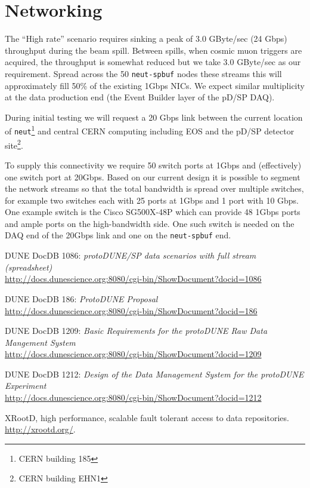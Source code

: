 \documentclass[pdftex,12pt,letter]{article}
\begin{document}
\section{Networking}

The ``High rate'' scenario requires sinking a peak of 3.0 GByte/sec
(24 Gbps) throughput during the beam spill.  Between spills, when
cosmic muon triggers are acquired, the throughput is somewhat reduced
but we take 3.0 GByte/sec as our requirement.  Spread across the 50
\texttt{neut-spbuf} nodes these streams this will approximately fill
50\% of the existing 1Gbps NICs.  We expect similar multiplicity at
the data production end (the Event Builder layer of the pD/SP DAQ).

During initial testing we will request a 20 Gbps link between the
current location of \texttt{neut}\footnote{CERN building 185} and
central CERN computing including EOS and the pD/SP detector
site\footnote{CERN building EHN1}.

To supply this connectivity we require 50 switch ports at 1Gbps and
(effectively) one switch port at 20Gbps.  Based on our current design
it is possible to segment the network streams so that the total
bandwidth is spread over multiple switches, for example two switches
each with 25 ports at 1Gbps and 1 port with 10 Gbps.  One example
switch is the Cisco SG500X-48P which can provide 48 1Gbps ports and
ample ports on the high-bandwidth side.  One such switch is needed on
the DAQ end of the 20Gbps link and one on the \texttt{neut-spbuf} end.

\begin{thebibliography}{1}
{DUNE DocDB 1086: \textit{ protoDUNE/SP data scenarios with full stream (spreadsheet)}}\\
\url{http://docs.dunescience.org:8080/cgi-bin/ShowDocument?docid=1086}

{DUNE DocDB 186: \textit{ ProtoDUNE Proposal}}\\
\url{http://docs.dunescience.org:8080/cgi-bin/ShowDocument?docid=186}


{DUNE DocDB 1209: \textit{Basic Requirements for the protoDUNE Raw Data Mangement System}}\\
\url{http://docs.dunescience.org:8080/cgi-bin/ShowDocument?docid=1209}


{DUNE DocDB 1212: \textit{Design of the Data Management System for the protoDUNE Experiment}}\\
\url{http://docs.dunescience.org:8080/cgi-bin/ShowDocument?docid=1212}



{XRootD, high performance, scalable fault tolerant access to data  repositories}.\\
  \url{http://xrootd.org/}.

\end{thebibliography}
\end{document}
